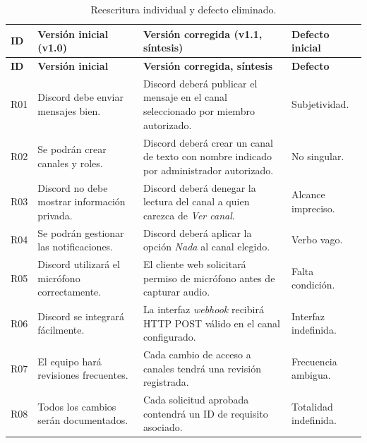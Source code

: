 \documentclass[12pt,a4paper]{article}
\begin{document}
\begin{longtable}{
    |p{0.75cm}
    |p{4.85cm}
    |p{5.8cm}
    |p{2.3cm}|
}

\caption{
Reescritura individual y defecto eliminado.
}
\label{tab:correccion}\\

\hline

\textbf{ID} &
\textbf{Versión inicial (v1.0)} &
\textbf{Versión corregida (v1.1, síntesis)} &
\textbf{Defecto inicial}\\

\hline
\endfirsthead

\hline
\textbf{ID} &
\textbf{Versión inicial} &
\textbf{Versión corregida, síntesis} &
\textbf{Defecto}\\
\hline
\endhead

R01 &
Discord debe enviar mensajes bien. &
Discord deberá publicar el mensaje en el canal seleccionado por miembro autorizado. &
Subjetividad.\\
\hline

R02 &
Se podrán crear canales y roles. &
Discord deberá crear un canal de texto con nombre indicado por administrador autorizado. &
No singular.\\
\hline

R03 &
Discord no debe mostrar información privada. &
Discord deberá denegar la lectura del canal a quien carezca de \emph{Ver canal}. &
Alcance impreciso.\\
\hline

R04 &
Se podrán gestionar las notificaciones. &
Discord deberá aplicar la opción \emph{Nada} al canal elegido. &
Verbo vago.\\
\hline

R05 &
Discord utilizará el micrófono correctamente. &
El cliente web solicitará permiso de micrófono antes de capturar audio. &
Falta condición.\\
\hline

R06 &
Discord se integrará fácilmente. &
La interfaz \emph{webhook} recibirá HTTP POST válido en el canal configurado. &
Interfaz indefinida.\\
\hline

R07 &
El equipo hará revisiones frecuentes. &
Cada cambio de acceso a canales tendrá una revisión registrada. &
Frecuencia ambigua.\\
\hline

R08 &
Todos los cambios serán documentados. &
Cada solicitud aprobada contendrá un ID de requisito asociado. &
Totalidad indefinida.\\
\hline


\end{longtable}
\end{document}
